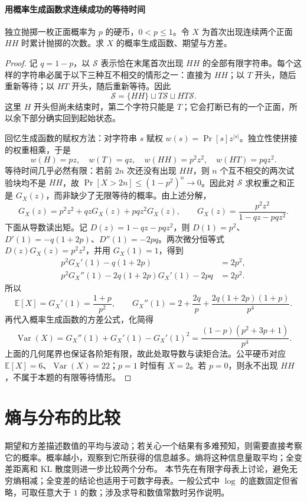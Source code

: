 \documentclass[lang=cn,a4paper,fontset=none,zihao=false,10pt,openany,twoside]{beautybook}
\numberwithin{algorithm}{chapter}
\begin{document}
\paragraph{用概率生成函数求连续成功的等待时间}
\begin{example}[首次连续出现两次正面]\label{ex:waiting-hh}
独立抛掷一枚正面概率为 $p$ 的硬币，$0<p\le1$。令 $X$ 为首次出现连续两个正面 $HH$ 时累计抛掷的次数。求 $X$ 的概率生成函数、期望与方差。
\end{example}
\begin{proof}
记 $q=1-p$，以 $\mathcal S$ 表示恰在末尾首次出现 $HH$ 的全部有限字符串。每个这样的字符串必属于以下三种互不相交的情形之一：直接为 $HH$；以 $T$ 开头，随后重新等待；以 $HT$ 开头，随后重新等待。因此
\[
 \mathcal S=\{HH\}\sqcup T\mathcal S\sqcup HT\mathcal S.
\]
这里 $H$ 开头但尚未结束时，第二个字符只能是 $T$；它会打断已有的一个正面，所以余下部分确实回到起始状态。

回忆生成函数的赋权方法：对字符串 $s$ 赋权 $w(s)=\Pr[s]z^{|s|}$。独立性使拼接的权重相乘，于是
\[
 w(H)=pz,\quad w(T)=qz,\quad w(HH)=p^2z^2,\quad w(HT)=pqz^2.
\]
等待时间几乎必然有限：若前 $2n$ 次还没有出现 $HH$，则 $n$ 个互不相交的两次试验块均不是 $HH$，故
$\Pr[X>2n]\le(1-p^2)^n\to0$。因此对 $\mathcal S$ 求权重之和正是 $G_X(z)$，而非缺少了无限等待的概率。由上述分解，
\[
 G_X(z)=p^2z^2+qzG_X(z)+pqz^2G_X(z),\qquad
 G_X(z)=\frac{p^2z^2}{1-qz-pqz^2}.
\]
下面从导数读出矩。记 $D(z)=1-qz-pqz^2$，则
$D(1)=p^2$、$D'(1)=-q(1+2p)$、$D''(1)=-2pq$。两次微分恒等式 $D(z)G_X(z)=p^2z^2$，并用 $G_X(1)=1$，得到
\begin{align*}
 p^2G_X'(1)-q(1+2p)&=2p^2,\\
 p^2G_X''(1)-2q(1+2p)G_X'(1)-2pq&=2p^2.
\end{align*}
所以
\[
 \mathbb E[X]=G_X'(1)=\frac{1+p}{p^2},\qquad
 G_X''(1)=2+\frac{2q}{p}+\frac{2q(1+2p)(1+p)}{p^4}.
\]
再代入概率生成函数的方差公式，化简得
\[
 \operatorname{Var}(X)=G_X''(1)+G_X'(1)-G_X'(1)^2
 =\frac{(1-p)(p^2+3p+1)}{p^4}.
\]
上面的几何尾界也保证各阶矩有限，故此处取导数与读矩合法。公平硬币对应 $\mathbb E[X]=6$、$\operatorname{Var}(X)=22$；$p=1$ 时恒有 $X=2$。若 $p=0$，则永不出现 $HH$，不属于本题的有限等待情形。
\end{proof}

\section{熵与分布的比较}\label{sec:entropy}
期望和方差描述数值的平均与波动；若关心一个结果有多难预知，则需要直接考察它的概率。概率越小，观察到它所获得的信息越多。熵将这种信息量取平均；全变差距离和 KL 散度则进一步比较两个分布。
本节先在有限字母表上讨论，避免无穷熵相减；全变差的结论也适用于可数字母表。一般公式中 $\log$ 的底数固定但省略，可取任意大于 $1$ 的数；涉及求导和数值常数时另作说明。
\end{document}
